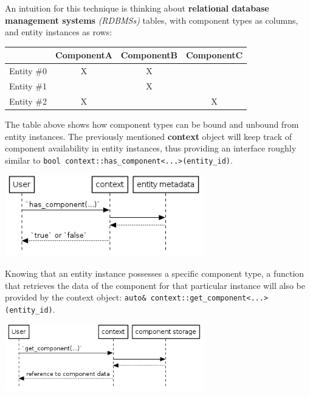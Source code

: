 \documentclass[oneside, 12pt, a4paper, openany]{book}
\let\origfigure=\figure
\let\endorigfigure=\endfigure
\renewenvironment{figure}[1][]{%
\origfigure[H]
}{%
\endorigfigure
}
\begin{document}
An intuition for this technique is thinking about \textbf{relational
database management systems} \emph{(RDBMSs)} tables, with component
types as columns, and entity instances as rows:

\begin{longtable}[]{@{}lccc@{}}
\toprule
& ComponentA & ComponentB & ComponentC\tabularnewline
\midrule
\endhead
Entity \#0 & X & X &\tabularnewline
Entity \#1 & & X &\tabularnewline
Entity \#2 & X & & X\tabularnewline
\bottomrule
\end{longtable}

The table above shows how component types can be bound and unbound from
entity instances. The previously mentioned \textbf{context} object will
keep track of component availability in entity instances, thus providing
an interface roughly similar to
\texttt{bool context::has_component<...>(entity_id)}.

\begin{figure}[htbp]
\centering
\includegraphics[width=0.65000\textwidth]{source/figures/generated/ecs/overview/dod_composition/uml_context_has_component.png}
\caption{DOD: checking component type availability through context
object}
\end{figure}

Knowing that an entity instance possesses a specific component type, a
function that retrieves the data of the component for that particular
instance will also be provided by the context object:
\texttt{auto& context::get_component<...>(entity_id)}.

\begin{figure}[htbp]
\centering
\includegraphics[width=0.65000\textwidth]{source/figures/generated/ecs/overview/dod_composition/uml_context_get_component.png}
\caption{DOD: getting component instance data through context object}
\end{figure}
\end{document}
